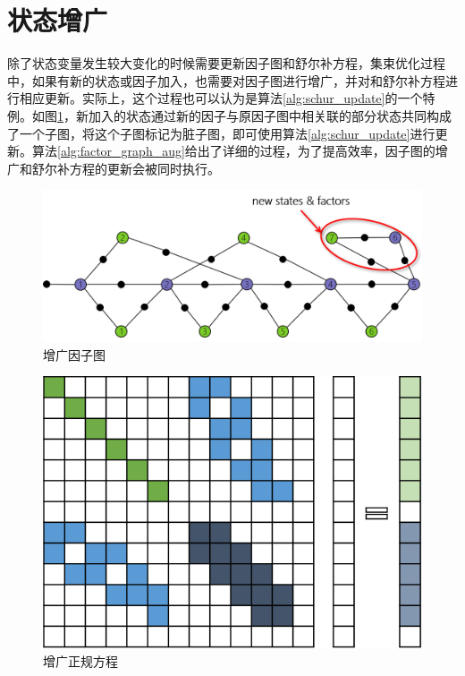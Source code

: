 \section{状态增广}

除了状态变量发生较大变化的时候需要更新因子图和舒尔补方程，集束优化过程中，如果有新的状态或因子加入，也需要对因子图进行增广，并对和舒尔补方程进行相应更新。实际上，这个过程也可以认为是算法\ref{alg:schur_update}的一个特例。如图\ref{fig:factor_graph_aug}，新加入的状态通过新的因子与原因子图中相关联的部分状态共同构成了一个子图，将这个子图标记为脏子图，即可使用算法\ref{alg:schur_update}进行更新。算法\ref{alg:factor_graph_aug}给出了详细的过程，为了提高效率，因子图的增广和舒尔补方程的更新会被同时执行。

\begin{figure}[htb!]
    \centering
    \includegraphics[scale=.7]{figs/factor_graph_aug.png}
    \caption{增广因子图}
    \label{fig:factor_graph_aug}
\end{figure}



\begin{figure}[htb!]
    \centering
    \includegraphics[scale=1]{figs/normal_eq_aug.png}
    \caption{增广正规方程}
    \label{fig:normal_eq_aug}
\end{figure}

